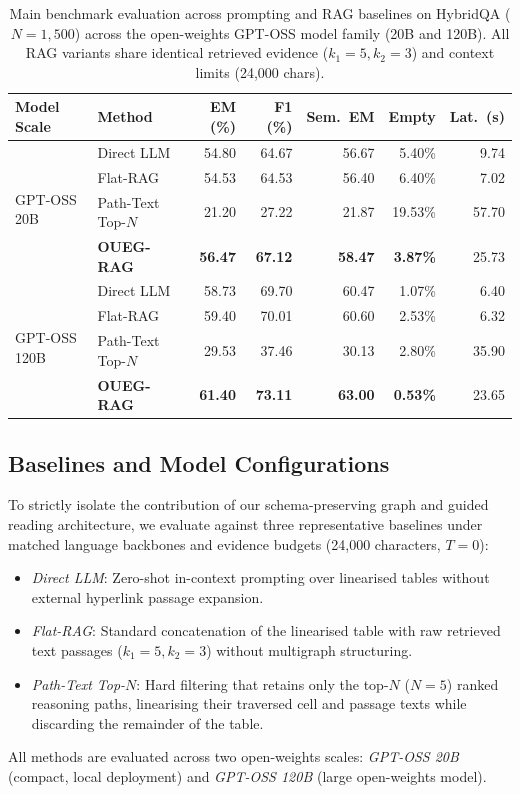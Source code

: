 \documentclass[runningheads]{llncs}
\begin{document}
\begin{table}[t]
\caption{Main benchmark evaluation across prompting and RAG baselines on HybridQA ($N=1{,}500$) across the open-weights GPT-OSS model family (20B and 120B). All RAG variants share identical retrieved evidence ($k_1=5, k_2=3$) and context limits (24,000 chars).}
\label{tab:main-results}
\centering
\scriptsize
\setlength{\tabcolsep}{3.2pt}
\begin{tabular}{@{}llrrrrr@{}}
\toprule
Model Scale & Method & EM (\%) & F1 (\%) & Sem.\ EM & Empty & Lat.\ (s) \\
\midrule
\multirow{4}{*}{GPT-OSS 20B}  & Direct LLM        & 54.80 & 64.67 & 56.67 & 5.40\% & 9.74 \\
                              & Flat-RAG          & 54.53 & 64.53 & 56.40 & 6.40\% & 7.02 \\
                              & Path-Text Top-$N$ & 21.20 & 27.22 & 21.87 & 19.53\% & 57.70 \\
                              & \textbf{OUEG-RAG} & \textbf{56.47} & \textbf{67.12} & \textbf{58.47} & \textbf{3.87\%} & 25.73 \\
\midrule
\multirow{4}{*}{GPT-OSS 120B} & Direct LLM        & 58.73 & 69.70 & 60.47 & 1.07\% & 6.40 \\
                              & Flat-RAG          & 59.40 & 70.01 & 60.60 & 2.53\% & 6.32 \\
                              & Path-Text Top-$N$ & 29.53 & 37.46 & 30.13 & 2.80\% & 35.90 \\
                              & \textbf{OUEG-RAG} & \textbf{61.40} & \textbf{73.11} & \textbf{63.00} & \textbf{0.53\%} & 23.65 \\
\bottomrule
\end{tabular}
\end{table}

\subsection{Baselines and Model Configurations}
\label{sec:baselines}
To strictly isolate the contribution of our schema-preserving graph and guided reading architecture, we evaluate against three representative baselines under matched language backbones and evidence budgets (24,000 characters, $T=0$):
\begin{itemize}
    \item \emph{Direct LLM}: Zero-shot in-context prompting over linearised tables without external hyperlink passage expansion.
    \item \emph{Flat-RAG}: Standard concatenation of the linearised table with raw retrieved text passages ($k_1=5, k_2=3$) without multigraph structuring.
    \item \emph{Path-Text Top-$N$}: Hard filtering that retains only the top-$N$ ($N=5$) ranked reasoning paths, linearising their traversed cell and passage texts while discarding the remainder of the table.
\end{itemize}
All methods are evaluated across two open-weights scales: \emph{GPT-OSS 20B} (compact, local deployment) and \emph{GPT-OSS 120B} (large open-weights model).
\end{document}
